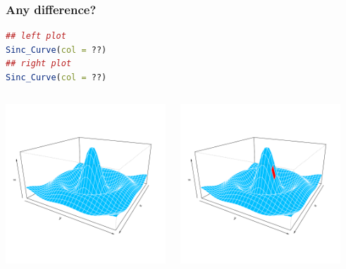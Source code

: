 \documentclass{beamer}
\begin{document}
\begin{frame}[fragile]
\frametitle{Any difference?}
\begin{lstlisting}[language = R]
## left plot
Sinc_Curve(col = ??)
## right plot
Sinc_Curve(col = ??)
\end{lstlisting}

\begin{columns}[c]
\includegraphics[height = 6cm, width = 6cm]{plot/persp_diff_1.pdf}

\includegraphics[height = 6cm, width = 6cm]{plot/persp_diff_2.pdf}

\end{columns}
\end{frame}



\end{document}
